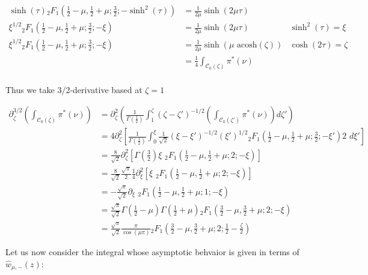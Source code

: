 \documentclass{article}
\begin{document}
\begin{align*}
\sinh(\tau) {}_2F_1\left(\frac{1}{2}-\mu,\frac{1}{2}+\mu;\frac{3}{2};-\sinh^2(\tau)\right)&=\frac{1}{2\mu}\sinh(2\mu\tau) & \\
\xi^{1/2} {}_2F_1\left(\frac{1}{2}-\mu,\frac{1}{2}+\mu;\frac{3}{2};-\xi\right)&=\frac{1}{2\mu}\sinh(2\mu\tau)  & \sinh^2(\tau)=\xi \\
\xi^{1/2} {}_2F_1\left(\frac{1}{2}-\mu,\frac{1}{2}+\mu;\frac{3}{2};-\xi\right)&=\frac{1}{2\mu}\sinh(\mu\,\,\mathrm{acosh}\left(\zeta\right))  & \cosh(2\tau)=\zeta \\
&=\frac{1}{4}\int_{\mathcal{C}_0(\zeta)}\pi^*(\nu) &\\
\end{align*}

Thus we take $3/2$-derivative based at $\zeta=1$

\begin{align*}
\partial_{\zeta}^{3/2}\left(\int_{\mathcal{C}_0(\zeta)}\pi^*(\nu)\right)&=\partial_\zeta^2\left(\frac{1}{\Gamma\left(\frac{1}{2}\right)}\int_1^\zeta(\zeta-\zeta')^{-1/2}\left(\int_{\mathcal{C}_0(\zeta')}\pi^*(\nu)\right)d\zeta'\right)\\
&=4\partial_\zeta^2\left[\frac{1}{\Gamma\left(\frac{1}{2}\right)}\int_0^\xi\frac{1}{\sqrt{2}}(\xi-\xi')^{-1/2}(\xi')^{1/2} {}_2F_1\left(\frac{1}{2}-\mu,\frac{1}{2}+\mu;\frac{3}{2};-\xi'\right) 2\,\,d\xi'\right]\\
&=\frac{8}{\sqrt{2}}\partial_\zeta^2\left[\Gamma\left(\frac{3}{2}\right)\xi\,\,{}_2F_1\left(\frac{1}{2}-\mu,\frac{1}{2}+\mu;2;-\xi\right)\right] \\
&=\frac{8}{\sqrt{2}}\frac{\sqrt{\pi}}{2}\frac{1}{4}\partial_\xi^2\left[\xi\,\,{}_2F_1\left(\frac{1}{2}-\mu,\frac{1}{2}+\mu;2;-\xi\right)\right]\\
&=-\frac{\sqrt{\pi}}{\sqrt{2}}\partial_{\xi}\,\, {}_2F_1\left(\frac{1}{2}-\mu,\frac{1}{2}+\mu;1;-\xi\right)\\
&=\frac{\sqrt{\pi}}{\sqrt{2}}\Gamma\left(\frac{1}{2}-\mu\right)\Gamma\left(\frac{1}{2}+\mu\right){}_2F_1\left(\frac{3}{2}-\mu,\frac{3}{2}+\mu;2;-\xi\right)\\
&=\frac{\sqrt{\pi}}{\sqrt{2}}\frac{\pi}{\cos(\mu \pi)}{}_2F_1\left(\frac{3}{2}-\mu,\frac{3}{2}+\mu;2;\frac{1}{2}-\frac{\zeta}{2}\right)
\end{align*}



Let us now consider the integral whose asymptotic behvaior is given in terms of $\hat{w}_{\mu,-}(z)$:
\end{document}
